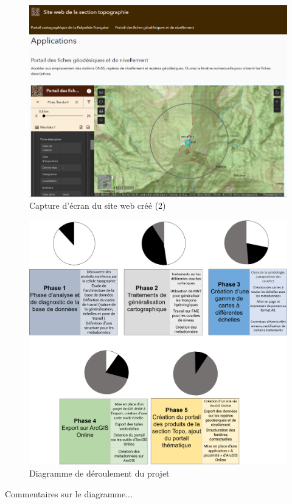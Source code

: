 \documentclass{themeensg}
\begin{document}
\begin{appendices}
\begin{figure}[!h]
\centering
\includegraphics[width=\linewidth]{images/Annexes/siteweb2.png}
\caption{Capture d'écran du site web créé (2) }
\label{site2}
\end{figure}
\label{annexepj}



\label{gantt}

\begin{figure}[!h]
\centering
\includegraphics[width=\linewidth]{images/Annexes/gantt.png}%
\caption{Diagramme de déroulement du projet}
\label{gantt}
\end{figure}


Commentaires sur le diagramme...

\clearpage




\end{appendices} 
\end{document}
